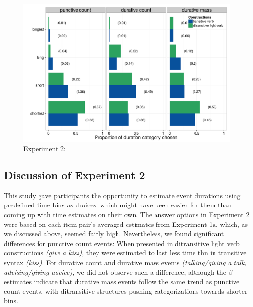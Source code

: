 \documentclass[preprint,12pt,authoryear]{elsarticle}
\begin{document}
\begin{figure}
\centering
\includegraphics[width=\textwidth]{./Figures/Exp2_CategorizationCategory.pdf}
\caption{Experiment 2: }
\label{fig_resCat}
\end{figure}


\subsection{Discussion of Experiment 2}\label{sec_discCat}
This study gave participants the opportunity to estimate event durations using predefined time bins as choices, which might have been easier for them than coming up with time estimates on their own. The answer options in Experiment 2 were based on each item pair's averaged estimates from Experiment 1a, which, as we discussed above, seemed fairly high. Nevertheless, we found significant differences for punctive count events: When presented in ditransitive light verb constructions \emph{(give a kiss)}, they were estimated to last less time thn in transitive syntax \emph{(kiss)}. For durative count and durative mass events \emph{(talking/giving a talk, advising/giving advice)}, we did not observe such a difference, although the $\beta$-estimates indicate that durative mass events follow the same trend as punctive count events, with ditransitive structures pushing categorizations towards shorter bins. 
\end{document}
